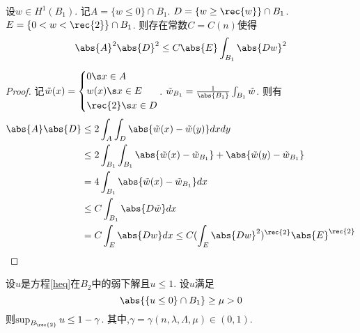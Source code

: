 \begin{proposition}\label{p1}
    设$w \in H^1(B_1)$. 记$A=\{w \le 0\}\cap B_1$. $D=\{w\ge \rec{w}\} \cap B_1$. $E=\{0<w<\rec{2}\} \cap B_1$. 则存在常数$C=C(n)$使得
    \begin{equation}
        \abs{A}^2\abs{D}^2 \le C\abs{E}\int_{B_1}\abs{Dw}^2
    \end{equation}
\end{proposition}
\begin{proof}
    记$\tilde{w}(x)=\left\{
        \begin{aligned}
            &0 \s x \in A \\
            &w(x) \s x \in E \\
            &\rec{2} \s x\in D
        \end{aligned}
    \right.$. $\tilde{w}_{B_1}=\frac{1}{\abs{B_1}}\int_{B_1}\tilde{w}$. 则有
    \begin{equation}
        \begin{split}
            \abs{A}\abs{D} &\le 2\int_A\int_D\abs{\tilde{w}(x)-\tilde{w}(y)}dxdy\\
            &\le 2\int_{B_1}\int_{B_1}\abs{\tilde{w}(x)-\tilde{w}_{B_1}} +\abs{\tilde{w}(y)-\tilde{w}_{B_1}} \\
            &=4\int_{B_1}\abs{\tilde{w}(x)-\tilde{w}_{B_1}} dx \\
            &\le C\int_{B_1}\abs{D\tilde{w}}dx \\
            &=C\int_E\abs{Dw}dx \le C(\int_E\abs{Dw}^2)^\rec{2}\abs{E}^\rec{2}
        \end{split}
    \end{equation}
\end{proof}
\begin{proposition}
    设$u$是方程\eqref{heq}在$B_2$中的弱下解且$u \le 1$. 设$u$满足
    \begin{equation}
        \abs{\{u \le 0\}\cap B_1} \ge \mu >0
    \end{equation}
    则$\sup_{B_\rec{2}}u \le 1-\gamma$. 其中,$\gamma=\gamma(n,\lambda,\Lambda,\mu) \in (0,1)$.
\end{proposition}
